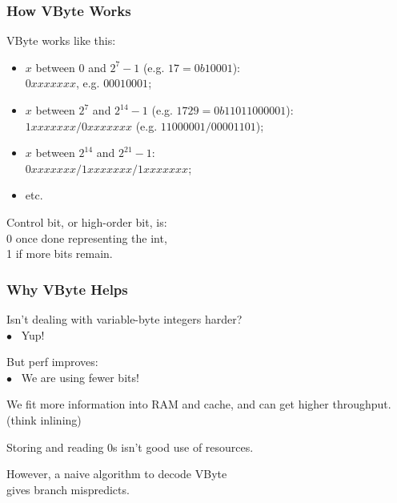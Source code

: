 \begin{frame}
\frametitle{How VByte Works}

\large\begin{changemargin}{1cm}
VByte works like this:

\begin{itemize}
\item $x$ between 0 and $2^7-1$ (e.g. $17 = 0b10001$):\\
\hspace*{1em}$0xxx xxxx$, e.g. $0001 0001$;
\item $x$ between $2^7$ and $2^{14}-1$ (e.g. $1729 = 0b110 11000001$):\\
\hspace*{1em}                   $1xxx xxxx/0xxx xxxx$ (e.g. $1100 0001/0000 1101$);\\
\item $x$ between $2^{14}$ and $2^{21}-1$: \\
\hspace*{1em}$0xxx xxxx/1xxx xxxx/1xxx xxxx$;
\item etc.
\end{itemize}

Control bit, or high-order bit, is:\\
\hspace*{2em}0 once done representing the int,\\
\hspace*{2em}1 if more bits remain.
\end{changemargin}

\end{frame}



\begin{frame}
\frametitle{Why VByte Helps}

\large\begin{changemargin}{2cm}
Isn't dealing with variable-byte integers harder?\\
\hspace*{2em} $\bullet$~ Yup!

But perf improves: \\
\hspace*{2em} $\bullet$~  We are using fewer bits! 

We fit more information into RAM and
cache, and can get higher throughput. (think inlining)

Storing and reading 0s isn't good use of resources. 

However, a naive algorithm to decode VByte \\
gives branch mispredicts.
\end{changemargin}
\end{frame}

